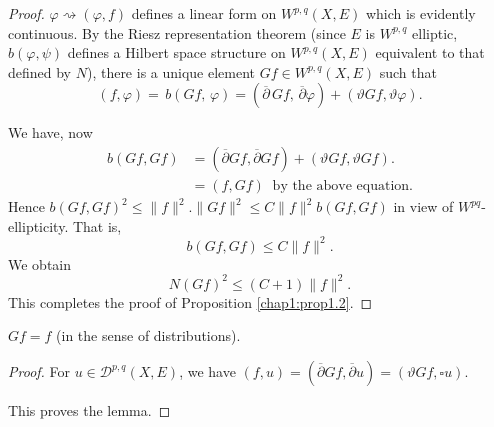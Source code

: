 \begin{proof}
  $\varphi \rightsquigarrow(\varphi,f)$ defines a linear form on
  $W^{p,q}(X,E)$ which is evidently continuous. By the Riesz
  representation theorem (since $E$ is  $W^{p,q}$ elliptic,
  $b(\varphi,\psi)$ defines a Hilbert space 
  structure on ${W}^{p,q}(X,E)$ equivalent to that defined by $N$),
  there is a unique element $Gf \in W^{p,q}
  (X,E)$ such that 
  $$
  (f, \varphi) = \,b (Gf, \,\varphi) = (\overline{\partial} \, Gf,\,
  \overline{\partial} \varphi) + (\vartheta Gf, \vartheta
  \varphi).
  $$ 

  We have, now
  \begin{align*}
    b(Gf, Gf) & = (\overline{\partial} Gf,
    \overline{\partial} Gf) + (\vartheta Gf, \vartheta Gf).\\ 
    &= (f, Gf)~\text{ by the above equation.}
  \end{align*} 
  Hence $b (Gf, Gf)^{2} \leqslant \| f\|^{2}. \| Gf\|^{2} \leqslant C
  \| f\|^{2} b (Gf, Gf)$ in view of $W^{{pq}}$-ellipticity. That is,
  $$
  b (Gf, Gf) \leqslant C \| f \|^{2}. 
  $$
  We obtain
  $$
  N (Gf)^{2} \leqslant (C+1) \| f\|^{2}. 
  $$
  This completes the proof of Proposition \ref{chap1:prop1.2}.
\end{proof}

\begin{coro*}
  $Gf = f$ (in the sense of distributions).
\end{coro*}

\begin{proof}
  For $u\in \mathscr{D}^{p,q} (X,E)$, we have
  $(f,u) = (\overline{\partial} Gf,
    \overline{\partial}u) = (\vartheta Gf, \square u)$. 
 
  This proves the lemma.
\end{proof}

